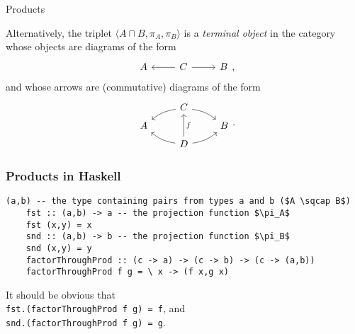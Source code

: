 \documentclass[10pt]{beamer}
\theoremstyle{definition}
\theoremstyle{remark}
\numberwithin{equation}{section}
\begin{document}
\begin{frame}[fragile]{Products}

  Alternatively, the triplet $\langle {A \sqcap B, \pi_A, \pi_B} \rangle$ is a \emph{terminal object}
  in the category whose objects are diagrams of the form
  \[
    \begin{tikzcd}
      A & C \arrow{l} \arrow{r} & B
    \end{tikzcd}\rlap{,}
  \]
  and whose arrows are (commutative) diagrams of the form
  \[
    \begin{tikzcd}[row sep=tiny]
       & C \arrow[bend right=15]{dl} \arrow[bend left=15]{dr} & \\
      A & & B \\
       & D \arrow[bend left=15]{ul} \arrow[swap]{uu}{f} \arrow[bend right=15]{ur} & 
    \end{tikzcd}\rlap{.}
  \]

\end{frame}

\begin{frame}[fragile]
  \frametitle{Products in Haskell}
  \begin{lstlisting}[frame=single,mathescape=true]
    (a,b) -- the type containing pairs from types a and b ($A \sqcap B$)
    fst :: (a,b) -> a -- the projection function $\pi_A$
    fst (x,y) = x
    snd :: (a,b) -> b -- the projection function $\pi_B$
    snd (x,y) = y
    factorThroughProd :: (c -> a) -> (c -> b) -> (c -> (a,b))
    factorThroughProd f g = \ x -> (f x,g x)
  \end{lstlisting}

  It should be obvious that\\
  \lstinline{fst.(factorThroughProd f g) = f}, and\\
  \lstinline{snd.(factorThroughProd f g) = g}.
  
\end{frame}
\end{document}
